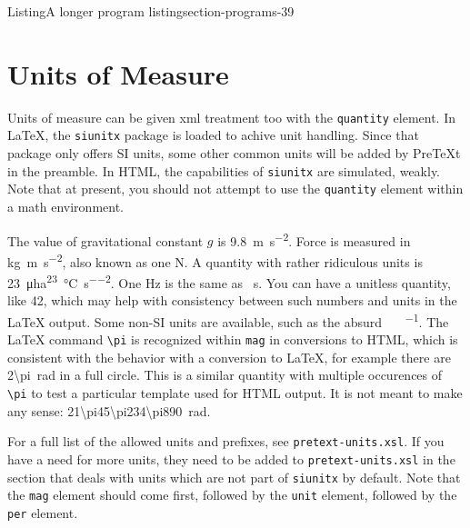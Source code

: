\documentclass{amsart}
\theoremstyle{plain}%
\theoremstyle{definition}%
\theoremstyle{remark}%
\newcommand{\mono}[1]{\texttt{#1}}
\numberwithin{equation}{section}
\begin{document}
\begin{listingptx}{Listing}{A longer program listing}{section-programs-39}{}
\tcblower
\end{listingptx}%
%
%
\typeout{************************************************}
\typeout{************************************************}
%
\section{Units of Measure}\label{section-units-measure}%
Units of measure can be given xml treatment too with the \mono{quantity} element. In \LaTeX{}, the \mono{siunitx} package is loaded to achive unit handling. Since that package only offers SI units, some other common units will be added by PreTeXt in the preamble. In HTML, the capabilities of \mono{siunitx} are simulated, weakly. Note that at present, you should not attempt to use the \mono{quantity} element within a math environment.%
\par
The value of gravitational constant \(g\) is \SI{9.8}{\meter\per\second\tothe{2}}. Force is measured in \si{\kilo\gram\meter\per\second\tothe{2}}, also known as one \si{\newton}. A quantity with rather ridiculous units is \SI{23}{\micro\hectare\tothe{23}\per\degreeCelsius\per\second\tothe{2}}. One \si{\hertz} is the same as \si{\per\second}. You can have a unitless quantity, like \num{42}, which may help with consistency between such numbers and units in the \LaTeX{} output. Some non-SI units are available, such as the absurd \si{\degreeFahrenheit\foot\pound\per\gallon}.  The \LaTeX{} command \mono{\textbackslash{}pi} is recognized within \mono{mag} in conversions to HTML, which is consistent with the behavior with a conversion to \LaTeX{}, for example there are \SI{2\pi}{\radian} in a full circle.  This is a similar quantity with multiple occurences of \mono{\textbackslash{}pi} to test a particular template used for HTML output.  It is not meant to make any sense: \SI{21\pi45\pi234\pi890}{\radian}.%
\par
For a full list of the allowed units and prefixes, see \mono{pretext-units.xsl}. If you have a need for more units, they need to be added to \mono{pretext-units.xsl} in the section that deals with units which are not part of \mono{siunitx} by default.  Note that the \mono{mag} element should come first, followed by the \mono{unit} element, followed by the \mono{per} element.%
%
%
\typeout{************************************************}
\typeout{************************************************}
%
\end{document}
